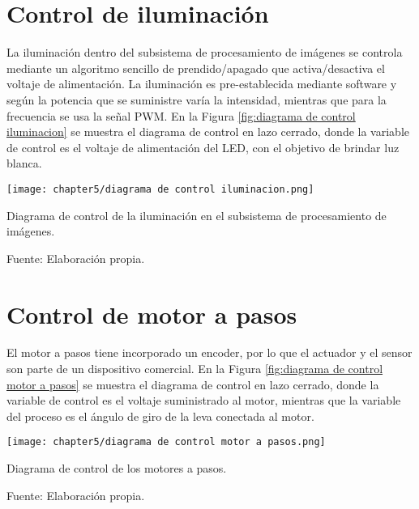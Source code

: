 \section{Control de iluminación}

La iluminación dentro del subsistema de procesamiento de imágenes se controla mediante un algoritmo sencillo de prendido/apagado que activa/desactiva el voltaje de alimentación. La iluminación es pre-establecida mediante software y según la potencia que se suministre varía la intensidad, mientras que para la frecuencia se usa la señal PWM. En la Figura \ref{fig:diagrama de control iluminacion} se muestra el diagrama de control en lazo cerrado, donde la variable de control es el voltaje de alimentación del LED, con el objetivo de brindar luz blanca.

\begin{myfigure}[H]
	\footnotesize\centering
	\texttt{[image: chapter5/diagrama de control iluminacion.png]}
	\caption{Diagrama de control de la iluminación en el subsistema de procesamiento de imágenes.}
	\begin{myflushcenter}
		Fuente: Elaboración propia.
	\end{myflushcenter}
	\label{fig:diagrama de control iluminacion}
\end{myfigure}


\section{Control de motor a pasos}

El motor a pasos tiene incorporado un encoder, por lo que el actuador y el sensor son parte de un dispositivo comercial. En la Figura \ref{fig:diagrama de control motor a pasos} se muestra el diagrama de control en lazo cerrado, donde la variable de control es el voltaje suministrado al motor, mientras que la variable del proceso es el ángulo de giro de la leva conectada al motor.

\begin{myfigure}[H]
	\footnotesize\centering
	\texttt{[image: chapter5/diagrama de control motor a pasos.png]}
	\caption{Diagrama de control de los motores a pasos.}
	\begin{myflushcenter}
		Fuente: Elaboración propia.
	\end{myflushcenter}
	\label{fig:diagrama de control motor a pasos}
\end{myfigure}

